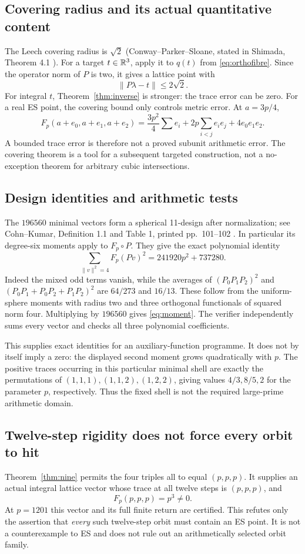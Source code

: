\documentclass[11pt,reqno]{amsart}
\theoremstyle{definition}\newtheorem{definition}[theorem]{Definition}
\theoremstyle{remark}\newtheorem{remark}[theorem]{Remark}
\begin{document}
\subsection{Covering radius and its actual quantitative content}
The Leech covering radius is $\sqrt2$ (Conway--Parker--Sloane, stated in Shimada, Theorem 4.1 \cite{Shimada}). For a target $t\in\mathbb R^3$, apply it to $q(t)$ from \eqref{eq:orthofibre}. Since the operator norm of $P$ is two, it gives a lattice point with
\[
\|P\lambda-t\|\le2\sqrt2.
\]
For integral $t$, Theorem~\ref{thm:inverse} is stronger: the trace error can be zero. For a real ES point, the covering bound only controls metric error. At $a=3p/4$,
\[
F_p(a+e_0,a+e_1,a+e_2)
=\frac{3p^2}{4}\sum e_i+2p\sum_{i<j}e_ie_j+4e_0e_1e_2.
\]
A bounded trace error is therefore not a proved subunit arithmetic error. The covering theorem is a tool for a subsequent targeted construction, not a no-exception theorem for arbitrary cubic intersections.

\subsection{Design identities and arithmetic tests}
The $196560$ minimal vectors form a spherical 11-design after normalization; see Cohn--Kumar, Definition 1.1 and Table 1, printed pp.~101--102 \cite{CK}. In particular its degree-six moments apply to $F_p\circ P$. They give the exact polynomial identity
\begin{equation}\label{eq:moment}
\sum_{\|v\|^2=4}F_p(Pv)^2=241920p^2+737280.
\end{equation}
Indeed the mixed odd terms vanish, while the averages of $(P_0P_1P_2)^2$ and $(P_0P_1+P_0P_2+P_1P_2)^2$ are $64/273$ and $16/13$. These follow from the uniform-sphere moments with radius two and three orthogonal functionals of squared norm four. Multiplying by $196560$ gives \eqref{eq:moment}. The verifier independently sums every vector and checks all three polynomial coefficients.

This supplies exact identities for an auxiliary-function programme. It does not by itself imply a zero: the displayed second moment grows quadratically with $p$. The positive traces occurring in this particular minimal shell are exactly the permutations of $(1,1,1),(1,1,2),(1,2,2)$, giving values $4/3,8/5,2$ for the parameter $p$, respectively. Thus the fixed shell is not the required large-prime arithmetic domain.

\subsection{Twelve-step rigidity does not force every orbit to hit}
Theorem~\ref{thm:nine} permits the four triples all to equal $(p,p,p)$. It supplies an actual integral lattice vector whose trace at all twelve steps is $(p,p,p)$, and
\[
F_p(p,p,p)=p^3\ne0.
\]
At $p=1201$ this vector and its full finite return are certified. This refutes only the assertion that \emph{every} such twelve-step orbit must contain an ES point. It is not a counterexample to ES and does not rule out an arithmetically selected orbit family.
\end{document}
